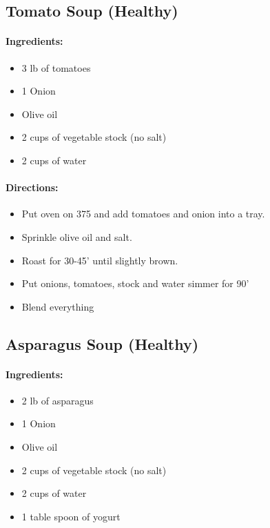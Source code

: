 \documentclass{article}
\begin{document}
\subsection{Tomato Soup (Healthy)}

\paragraph{Ingredients:}
\begin{itemize}
    \item 3 lb of tomatoes
    \item 1 Onion
    \item Olive oil
    \item 2 cups of vegetable stock (no salt)
    \item 2 cups of water
\end{itemize}

\paragraph{Directions:}
\begin{itemize}
    \item Put oven on 375 and add tomatoes and onion into a tray.
    \item Sprinkle olive oil and salt.
    \item Roast for 30-45' until slightly brown.
    \item Put onions, tomatoes, stock and water simmer for 90'
    \item Blend everything
\end{itemize}

\subsection{Asparagus Soup (Healthy)}

\paragraph{Ingredients:}
\begin{itemize}
    \item 2 lb of asparagus
    \item 1 Onion
    \item Olive oil
    \item 2 cups of vegetable stock (no salt)
    \item 2 cups of water
    \item 1 table spoon of yogurt
\end{itemize}
\end{document}
